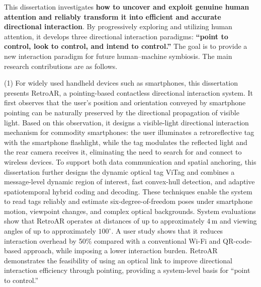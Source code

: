 \begin{eabstract}
This dissertation investigates \textbf{how to uncover and exploit genuine human attention and reliably transform it into efficient and accurate directional interaction}. By progressively exploring and utilizing human attention, it develops three directional interaction paradigms: \textbf{``point to control, look to control, and intend to control.''} The goal is to provide a new interaction paradigm for future human--machine symbiosis. The main research contributions are as follows.

(1) For widely used handheld devices such as smartphones, this dissertation presents RetroAR, a pointing-based contactless directional interaction system. It first observes that the user's position and orientation conveyed by smartphone pointing can be naturally preserved by the directional propagation of visible light. Based on this observation, it designs a visible-light directional interaction mechanism for commodity smartphones: the user illuminates a retroreflective tag with the smartphone flashlight, while the tag modulates the reflected light and the rear camera receives it, eliminating the need to search for and connect to wireless devices. To support both data communication and spatial anchoring, this dissertation further designs the dynamic optical tag ViTag and combines a message-level dynamic region of interest, fast convex-hull detection, and adaptive spatiotemporal hybrid coding and decoding. These techniques enable the system to read tags reliably and estimate six-degree-of-freedom poses under smartphone motion, viewpoint changes, and complex optical backgrounds. System evaluations show that RetroAR operates at distances of up to approximately $4\,\mathrm{m}$ and viewing angles of up to approximately $100^\circ$. A user study shows that it reduces interaction overhead by 50\% compared with a conventional Wi-Fi and QR-code-based approach, while imposing a lower interaction burden. RetroAR demonstrates the feasibility of using an optical link to improve directional interaction efficiency through pointing, providing a system-level basis for ``point to control.''


\end{eabstract}
